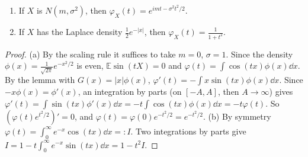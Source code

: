 \begin{proposition}\label{prop:cfexamples}
\begin{enumerate}[label=(\alph*)]
\item If $X$ is $N(m,\sigma^2)$, then $\varphi_X(t)=e^{imt-\sigma^2t^2/2}$.
\item If $X$ has the Laplace density $\frac12e^{-|x|}$, then $\varphi_X(t)=\frac1{1+t^2}$.
\end{enumerate}
\end{proposition}
\begin{proof}
(a) By the scaling rule it suffices to take $m=0$, $\sigma=1$. Since the density $\phi(x)=\frac1{\sqrt{2\pi}}e^{-x^2/2}$ is even, $\mathbb E\sin(tX)=0$ and $\varphi(t)=\int\cos(tx)\phi(x)\dd x$.
By the lemma with $G(x)=|x|\phi(x)$, $\varphi'(t)=-\int x\sin(tx)\phi(x)\dd x$. Since $-x\phi(x)=\phi'(x)$, an integration by parts (on $[-A,A]$, then $A\to\infty$) gives
$\varphi'(t)=\int\sin(tx)\phi'(x)\dd x=-t\int\cos(tx)\phi(x)\dd x=-t\varphi(t)$. So $(\varphi(t)e^{t^2/2})'=0$, and $\varphi(t)=\varphi(0)e^{-t^2/2}=e^{-t^2/2}$.
(b) By symmetry $\varphi(t)=\int_0^\infty e^{-x}\cos(tx)\dd x=:I$. Two integrations by parts give $I=1-t\int_0^\infty e^{-x}\sin(tx)\dd x=1-t^2I$.
\end{proof}

